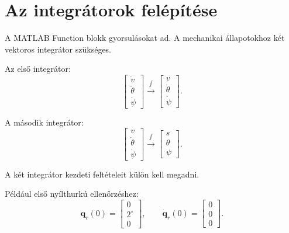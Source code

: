 \documentclass[12pt,a4paper]{article}
\begin{document}
	\section{Az integrátorok felépítése}
	
	A MATLAB Function blokk gyorsulásokat ad. A mechanikai állapotokhoz két vektoros integrátor szükséges.
	
	Az első integrátor:
	\begin{equation}
		\begin{bmatrix}
			\dot v\\
			\ddot\theta\\
			\ddot\psi
		\end{bmatrix}
		\xrightarrow{\int}
		\begin{bmatrix}
			v\\
			\dot\theta\\
			\dot\psi
		\end{bmatrix}.
	\end{equation}
	
	A második integrátor:
	\begin{equation}
		\begin{bmatrix}
			v\\
			\dot\theta\\
			\dot\psi
		\end{bmatrix}
		\xrightarrow{\int}
		\begin{bmatrix}
			s\\
			\theta\\
			\psi
		\end{bmatrix}.
	\end{equation}
	
	A két integrátor kezdeti feltételeit külön kell megadni.
	
	Például első nyílthurkú ellenőrzéshez:
	\begin{equation}
		\bm q_r(0)=
		\begin{bmatrix}
			0\\
			2^\circ\\
			0
		\end{bmatrix},
		\qquad
		\dot{\bm q}_r(0)=
		\begin{bmatrix}
			0\\
			0\\
			0
		\end{bmatrix}.
	\end{equation}
	
\end{document}
